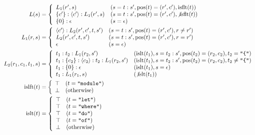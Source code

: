 \begin{align*}
  L(s) &= \left\{\begin{array}{ll}
    L_1(r', s) &(s = t:s', \mathrm{pos}(t) = (r', c'), \mathrm{isflt}(t)) \\
    \{c'\}:\langle c'\rangle:L_1(r', s) &(s = t:s', \mathrm{pos}(t) = (r', c'), \not\mathrm{isflt}(t)) \\
    \{0\}:\epsilon &(s = \epsilon)
  \end{array}\right. \\
  L_1(r, s) &= \left\{\begin{array}{ll}
    \langle c'\rangle:L_2(r', c', t, s') &(s = t:s', \mathrm{pos}(t) = (r', c'), r \neq r') \\
    L_2(r', c', t, s') &(s = t:s', \mathrm{pos}(t) = (r', c'), r = r') \\
    \epsilon &(s = \epsilon)
  \end{array}\right. \\
  L_2(r_1, c_1, t_1, s) &= \left\{\begin{array}{ll}
    t_1:t_2:L_1(r_2, s') &(\mathrm{islt}(t_1), s = t_2:s', \mathrm{pos}(t_2) = (r_2, c_2), t_2 = \text{\texttt{\textquotedbl\{\textquotedbl}}) \\
    t_1:\{c_2\}:\langle c_2\rangle:t_2:L_1(r_2, s') &(\mathrm{islt}(t_1), s = t_2:s', \mathrm{pos}(t_2) = (r_2, c_2), t_2 \neq \text{\texttt{\textquotedbl\{\textquotedbl}}) \\
    t_1:\{0\}:\epsilon &(\mathrm{islt}(t_1), s = \epsilon) \\
    t_1:L_1(r_1, s) &(\not\mathrm{islt}(t_1))
  \end{array}\right. \\
  \mathrm{islft}(t) &= \left\{\begin{array}{ll}
    \top &(t = \text{\texttt{\textquotedbl module\textquotedbl}}) \\
    \bot &(\text{otherwise})
  \end{array}\right. \\
  \mathrm{islt}(t) &= \left\{\begin{array}{ll}
    \top &(t = \text{\texttt{\textquotedbl let\textquotedbl}}) \\
    \top &(t = \text{\texttt{\textquotedbl where\textquotedbl}}) \\
    \top &(t = \text{\texttt{\textquotedbl do\textquotedbl}}) \\
    \top &(t = \text{\texttt{\textquotedbl of\textquotedbl}}) \\
    \bot &(\text{otherwise})
  \end{array}\right.
\end{align*}

